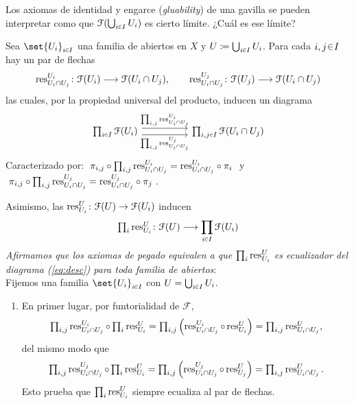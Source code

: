 \begin{ejer}
Los axiomas de identidad y engarce (\emph{gluability}) de una gavilla se pueden interpretar como que $\mathcal{F}(\bigcup_{i\en I}U_i)$ es cierto límite. ¿Cuál es ese límite?
\end{ejer}
\begin{sol}
Sea $\set{U_i}_{i\en I}$ una familia de abiertos en $X$ y $U\coloneq\bigcup_{i\en I}U_i$. Para cada $i,j\en I$ hay un par de flechas
\[
\operatorname{res}^{U_i}_{U_i\cap U_j}\colon\mathcal{F}(U_i)\longrightarrow\mathcal{F}(U_i\cap U_j),
\qquad
\operatorname{res}^{U_j}_{U_i\cap U_j}\colon\mathcal{F}(U_j)\longrightarrow\mathcal{F}(U_i\cap U_j)
\]
las cuales, por la propiedad universal del producto, inducen un diagrama
\begin{equation}\label{eq:desc}
\begin{tikzcd}[column sep=huge]
\prod_{i\en I}\mathcal{F}(U_i)
\arrow[r,shift left=.8ex,
"{\prod_{i,j}\res^{U_i}_{U_i\cap U_j}}"]
\arrow[r,shift right=.8ex,swap,
"{\prod_{i,j}\res^{U_j}_{U_i\cap U_j}}"]
& \prod_{i,j\en I}\mathcal{F}(U_i\cap U_j)
\end{tikzcd}
\end{equation}
Caracterizado por: $\;\pi_{i,j}\circ \prod_{i,j}{\operatorname{res}^{U_i}_{U_i\cap U_j}} = {\operatorname{res}^{U_i}_{U_i\cap U_j}} \circ \pi_i\;$ y $\;\pi_{i,j}\circ \prod_{i,j}{\operatorname{res}^{U_j}_{U_i\cap U_j}} = {\operatorname{res}^{U_j}_{U_i\cap U_j}} \circ \pi_j\;$.

Asimismo, las $\operatorname{res}^U_{U_i}\colon\mathcal{F}(U)\to\mathcal{F}(U_i)$ inducen
\[
{\textstyle\prod_i\res^U_{U_i}}\colon\mathcal{F}(U)\longrightarrow\prod_{i\en I}\mathcal{F}(U_i)
\]
\emph{Afirmamos que los axiomas de pegado equivalen a que $\prod_i\operatorname{res}^U_{U_i}$ es ecualizador del diagrama (\ref{eq:desc}) para toda familia de abiertos}:\\
Fijemos una familia $\set{U_i}_{i\en I}$ con $U=\bigcup_{i\en I}U_i$.
\begin{enumerate}
\item 
En primer lugar, por funtorialidad de $\mathcal{F}$,
\[\textstyle
\prod_{i,j}\operatorname{res}^{U_i}_{U_i\cap U_j}\circ\prod_i\operatorname{res}^U_{U_i}
=\prod_{i,j}\left(\operatorname{res}^{U_i}_{U_i\cap U_j}\circ\operatorname{res}^U_{U_i}\right)
=\prod_{i,j}\operatorname{res}^U_{U_i\cap U_j},
\]
del mismo modo que
\[\textstyle
\prod_{i,j}\operatorname{res}^{U_j}_{U_i\cap U_j}\circ\prod_i\operatorname{res}^U_{U_i}
=\prod_{i,j}\left(\operatorname{res}^{U_j}_{U_i\cap U_j}\circ\operatorname{res}^U_{U_j}\right)
=\prod_{i,j}\operatorname{res}^U_{U_i\cap U_j}.
\]
Esto prueba que $\prod_i\operatorname{res}^U_{U_i}$ siempre ecualiza al par de flechas.


\end{enumerate}
\end{sol}
